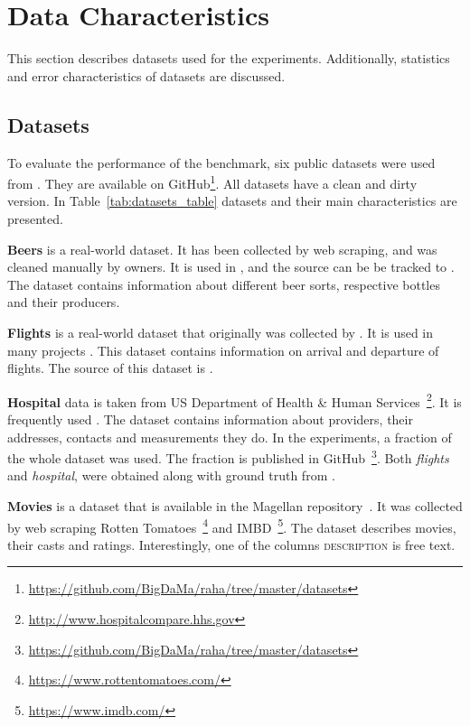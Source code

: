 \section{Data Characteristics}
\label{sec:data_charcteristics}

This section describes datasets used for the experiments.
Additionally, statistics and error characteristics of datasets are discussed.

\subsection{Datasets}



To evaluate the performance of the benchmark, six public datasets were used from \textcite{MahdaviAFMQST2019, MahdaviA2020}. 
They are available on GitHub\footnote{\url{https://github.com/BigDaMa/raha/tree/master/datasets}}.
All datasets have a clean and dirty version.
In Table~\ref{tab:datasets_table} datasets and their main characteristics are presented.

\textbf{Beers} is a real-world dataset. It has been collected by web scraping, and was cleaned manually by owners.
It is used in \textcite{MahdaviAFMQST2019, MahdaviA2020},
and the source can be be tracked to \textcite{Hould2017WEB, Hould2017KAGGLE}. 
The dataset contains information about different beer sorts, respective bottles and their producers.

\textbf{Flights} is a real-world dataset that originally was collected by \textcite{LiDLMS2015}. 
It is used in many projects \cite{HeidariMIR2019, raha, LiDLMS2015}.
This dataset contains information on arrival and departure of flights.
The source of this dataset is \textcite{LiDLMS2015}.

\textbf{Hospital} data is taken from US Department of Health \& Human Services~\footnote{\url{http://www.hospitalcompare.hhs.gov}}. 
It is frequently used \cite{RestatGCS2022, ChuIP2013, DallachiesaEEEIOT2013, HeidariMIR2019,MahdaviAFMQST2019, MahdaviA2020, RekatsinasCIR2017}.
The dataset contains information about providers, their addresses, contacts and measurements they do.
In the experiments, a fraction of the whole dataset was used.
The fraction is published in GitHub~\footnote{\url{https://github.com/BigDaMa/raha/tree/master/datasets}}.
Both \textit{flights} and \textit{hospital}, were obtained along with ground truth from \textcite{HeidariMIR2019}.

\textbf{Movies} is a dataset that is available in the Magellan repository~\cite{DasDGGKGP2016, KondaDSDABLPZNPKDR2016}.
It was collected by web scraping Rotten Tomatoes~\footnote{\url{https://www.rottentomatoes.com/}} and IMBD~\footnote{\url{https://www.imdb.com/}}.
The dataset describes movies, their casts and ratings. 
Interestingly, one of the columns \textsc{description} is free text.

